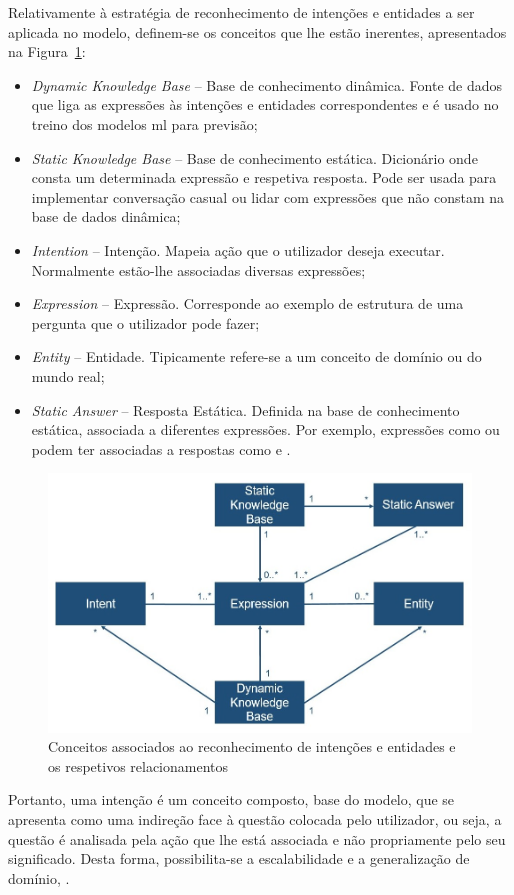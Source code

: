Relativamente à estratégia de reconhecimento de intenções e entidades a ser aplicada no modelo, definem-se os conceitos que lhe estão inerentes, apresentados na Figura~\ref{fig:domain_model}:

\begin{itemize}
    \item 
    {
        \textit{Dynamic Knowledge Base} -- Base de conhecimento dinâmica. Fonte de dados que liga as expressões às intenções e entidades correspondentes e é usado no treino dos modelos \gls{ml} para previsão;
    }
    \item 
    {
        \textit{Static Knowledge Base} -- Base de conhecimento estática. Dicionário onde consta um determinada expressão e respetiva resposta. Pode ser usada para implementar conversação casual ou lidar com expressões que não constam na base de dados dinâmica;
    }
    \item 
    {
        \textit{Intention} -- Intenção. Mapeia ação que o utilizador deseja executar. Normalmente estão-lhe associadas diversas expressões;
    }
    \item 
    {
        \textit{Expression} -- Expressão. Corresponde ao exemplo de estrutura de uma pergunta que o utilizador pode fazer;
    }
    \item 
    {
        \textit{Entity} -- Entidade. Tipicamente refere-se a um conceito de domínio ou do mundo real;
    }
    \item 
    {
        \textit{Static Answer} -- Resposta Estática. Definida na base de conhecimento estática, associada a diferentes expressões. Por exemplo, expressões como  ou  podem ter associadas a respostas como  e .
    }
\end{itemize}
%
\begin{figure}
    \centering
    \includegraphics[width=.9\textwidth]{ch04/assets/domain-model.jpg}
    \caption{Conceitos associados ao reconhecimento de intenções e entidades e os respetivos relacionamentos}
    \label{fig:domain_model}
\end{figure}
%
Portanto, uma intenção é um conceito composto, base do modelo, que se apresenta como uma indireção face à questão colocada pelo utilizador, ou seja, a questão é analisada pela ação que lhe está associada e não propriamente pelo seu significado. Desta forma, possibilita-se a escalabilidade e a generalização de domínio, .

